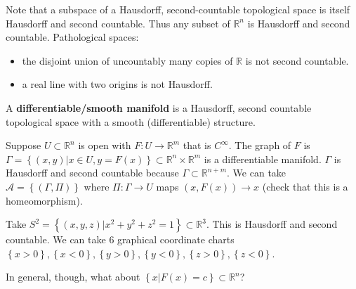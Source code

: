 \documentclass{mathnotes}
\begin{document}
Note that a subspace of a Hausdorff, second-countable topological space is itself Hausdorff and second countable. Thus any subset of $\mathbb{R}^n$ is
Hausdorff and second countable. Pathological spaces:
\begin{itemize}
    \item the disjoint union of uncountably many copies of $\mathbb{R}$ is not second countable.
    \item a real line with two origins is not Hausdorff.
\end{itemize}

\begin{defn}
    A \textbf{differentiable/smooth manifold} is a Hausdorff, second countable topological space with a smooth (differentiable) structure.
\end{defn}

\begin{exmp}
    Suppose $U\subset\mathbb{R}^n$ is open with $F:U\to\mathbb{R}^m$ that is $C^\infty$. The graph of $F$ is
    $\Gamma=\left\{ (x,y) | x\in U, y=F(x) \right\}\subset\mathbb{R}^n\times\mathbb{R}^m$
    is a differentiable manifold. $\Gamma$ is Hausdorff and second countable because $\Gamma\subset\mathbb{R}^{n+m}$. We can take $\mathcal{A}=\left\{ (\Gamma, \Pi) \right\}$
    where $\Pi:\Gamma\to U$ maps $(x,F(x))\to x$ (check that this is a homeomorphism).
\end{exmp}

\begin{exmp}
    Take $S^2=\left\{ (x,y,z) | x^2+y^2+z^2=1 \right\}\subset\mathbb{R}^3$. This is Hausdorff and second countable. We can take 6 graphical coordinate charts
    $\left\{ x>0 \right\},\left\{ x<0 \right\},\left\{ y>0 \right\},\left\{ y<0 \right\},\left\{ z>0 \right\},\left\{ z<0 \right\}$.
\end{exmp}

In general, though, what about $\left\{ x | F(x)=c \right\}\subset \mathbb{R}^n$? 
\end{document}
